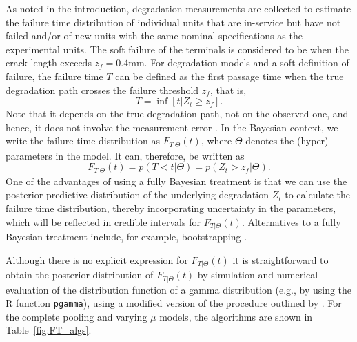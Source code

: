As noted in the introduction, degradation measurements are collected to estimate the failure time distribution of individual units that are in-service but have not failed and/or of new units with the same nominal specifications as the experimental units. The soft failure of the terminals is considered to be when the crack length exceeds $z_f = 0.4$mm. For degradation models and a soft definition of failure, the failure time $T$ can be defined as the first passage time when the true degradation path crosses the failure threshold $z_f$\citep{balakrishnan_2017}, that is,
$$
T = \inf\left[ t|Z_t \geq z_f \right].
$$
Note that it depends on the true degradation path, not on the observed one, and hence, it does not involve the measurement error \citep{hamada_2008}. In the Bayesian context, we write the failure time distribution as $F_{T|\Theta}(t)$, where $\Theta$ denotes the (hyper) parameters in the model. It can, therefore, be written as
$$
F_{T|\Theta}(t) = p(T < t | \Theta) = p(Z_t > z_f | \Theta).
$$
One of the advantages of using a fully Bayesian treatment is that we can use the posterior predictive distribution of the underlying degradation $Z_t$ to calculate the failure time distribution, thereby incorporating uncertainty in the parameters, which will be reflected in credible intervals for $F_{T|\Theta}(t)$. Alternatives to a fully Bayesian treatment include, for example, bootstrapping \citep{peng_2018}.

Although there is no explicit expression for $F_{T|\Theta}(t)$ it is straightforward to obtain the posterior distribution of $F_{T|\Theta}(t)$ by simulation and numerical evaluation of the distribution function of a gamma distribution (e.g., by using the R function \texttt{pgamma}), using a modified version of the procedure outlined by \citet[Sec.~8.2.1]{hamada_2008}. For the complete pooling and varying $\mu$ models, the algorithms are shown in Table~\ref{fig:FT_algs}.

